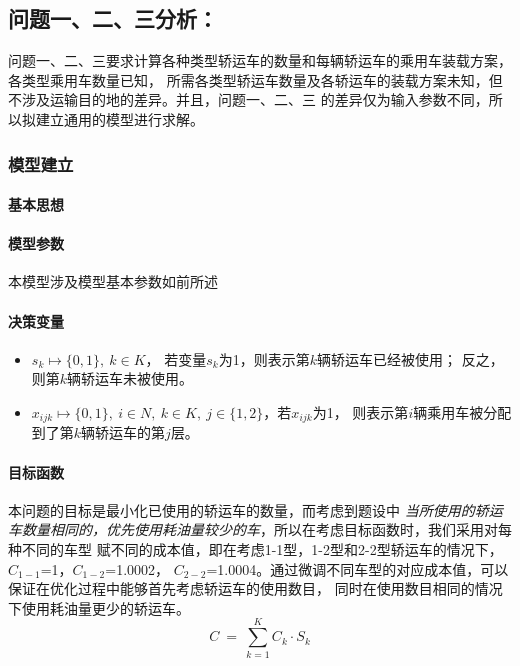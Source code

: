 \documentclass[UTF8]{ctexart}
\begin{document}
\subsection{问题一、二、三分析：}
问题一、二、三要求计算各种类型轿运车的数量和每辆轿运车的乘用车装载方案，各类型乘用车数量已知，
所需各类型轿运车数量及各轿运车的装载方案未知，但不涉及运输目的地的差异。并且，问题一、二、三
的差异仅为输入参数不同，所以拟建立通用的模型进行求解。

\subsubsection{模型建立}
\paragraph{基本思想}

\paragraph{模型参数}
	本模型涉及模型基本参数如前所述
\paragraph{决策变量}
\begin{itemize}
	\item $s_k \mapsto \{0,1\}, ~ k \in K$， 若变量$s_k$为1，则表示第$k$辆轿运车已经被使用；
	反之，则第$k$辆轿运车未被使用。
	\item $x_{ijk}\mapsto \{0,1\}, ~ i\in N,~ k \in K,~ j\in \{1,2\}$，若$x_{ijk}$为1，
	则表示第$i$辆乘用车被分配到了第$k$辆轿运车的第$j$层。
\end{itemize}

\paragraph{目标函数}
	本问题的目标是最小化已使用的轿运车的数量，而考虑到题设中
	\textit{当所使用的轿运车数量相同的，优先使用耗油量较少的车}，所以在考虑目标函数时，我们采用对每种不同的车型
	赋不同的成本值，即在考虑1-1型，1-2型和2-2型轿运车的情况下，$C_{1-1}$=1，$C_{1-2}$=1.0002，
	$C_{2-2}$=1.0004。通过微调不同车型的对应成本值，可以保证在优化过程中能够首先考虑轿运车的使用数目，
	同时在使用数目相同的情况下使用耗油量更少的轿运车。
	\begin{equation}
		C \ = \ \sum_{k=1}^{K}C_k \cdot S_k
	\end{equation}
\end{document}
